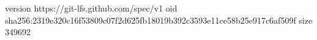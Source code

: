 version https://git-lfs.github.com/spec/v1
oid sha256:2319e320c16f53809c07f2d625fb18019b392c3593e11ce58b25e917c6af509f
size 349692
